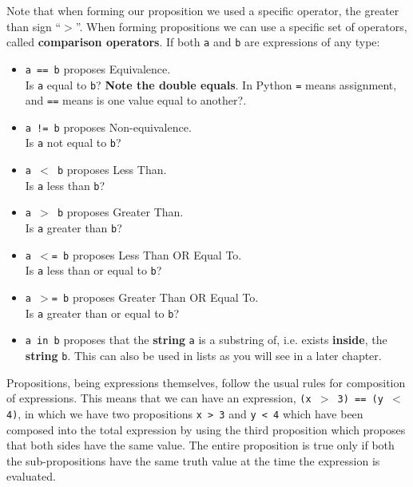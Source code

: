 Note that when forming our proposition we used a specific operator,   the greater than sign ``$>$''. When forming propositions we can use a   specific set of operators, called \textbf{comparison   operators}. If both \texttt{a} and \texttt{b} are expressions of any   type:
\begin{itemize}
	\item 
\texttt{a == b} proposes Equivalence. \\
Is \texttt{a} equal to \texttt{b}?    \textbf{Note the double equals}. In Python \texttt{=} means    assignment, and \texttt{==} means is one value equal to another?.
	\item 
\texttt{a != b} proposes Non-equivalence. \\
Is \texttt{a} not equal    to \texttt{b}?
	\item 
\texttt{a $<$ b} proposes Less Than. \\
Is \texttt{a} less than    \texttt{b}?
	\item 
\texttt{a $>$ b} proposes Greater Than. \\
Is \texttt{a} greater than    \texttt{b}?
	\item 
\texttt{a $<$= b} proposes Less Than OR Equal To. \\
Is \texttt{a} less than or equal to   \texttt{b}?
	\item 
\texttt{a $>$= b} proposes Greater Than OR Equal To. \\
Is \texttt{a} greater than or equal to   \texttt{b}?
	\item 
\texttt{a in b} proposes that the \textbf{string} \texttt{a}    is a substring of, i.e. exists \textbf{inside}, the    \textbf{string} \texttt{b}. This can also be used in lists as you will see in a later chapter.
\end{itemize}

Propositions, being expressions themselves, follow the usual rules   for composition of expressions. This means that we can have an   expression, 
\texttt{(x $>$ 3) == (y $<$ 4)}, in which we have two   propositions \texttt{x > 3} and \texttt{y < 4} which have been composed into   the total expression by using the third proposition which proposes that both sides have the same value. The entire proposition is true only if both the   sub-propositions have the same truth value at the time the expression   is evaluated.


